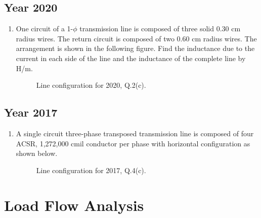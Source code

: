 \documentclass[12pt, a4paper]{article}
\begin{document}
	\subsection{Year 2020}
	\begin{enumerate}[label=\textbf{Q2(c).}, wide, labelindent=0pt]
		\item One circuit of a 1-$\phi$ transmission line is composed of three solid 0.30 cm radius wires. The return circuit is composed of two 0.60 cm radius wires. The arrangement is shown in the following figure. Find the inductance due to the current in each side of the line and the inductance of the complete line by H/m.
		\begin{figure}[h!]
			\centering
			\caption{Line configuration for 2020, Q.2(c).}
		\end{figure}
	\end{enumerate}
	
	\subsection{Year 2017}
	\begin{enumerate}[label=\textbf{Q4(c).}, wide, labelindent=0pt]
		\item A single circuit three-phase transposed transmission line is composed of four ACSR, 1,272,000 cmil conductor per phase with horizontal configuration as shown below.
		\begin{figure}[h!]
			\centering
			\caption{Line configuration for 2017, Q.4(c).}
		\end{figure}
	\end{enumerate}
	
	\section{Load Flow Analysis}
\end{document}
